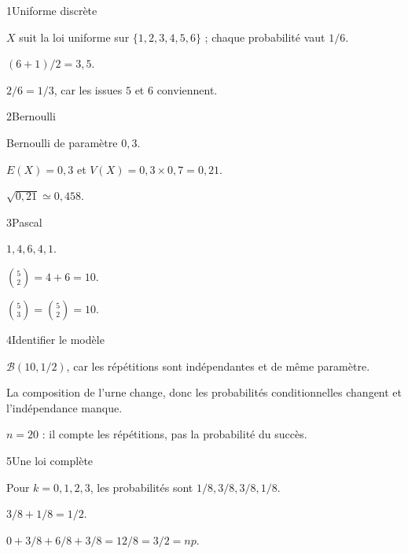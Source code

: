 \begin{corrige}{1}{Uniforme discrète}
\begin{questions}
\item $X$ suit la loi uniforme sur $\{1,2,3,4,5,6\}$ ; chaque probabilité vaut $1/6$.
\item $(6+1)/2=3{,}5$.
\item $2/6=1/3$, car les issues $5$ et $6$ conviennent.
\end{questions}
\end{corrige}
\begin{corrige}{2}{Bernoulli}
\begin{questions}
\item Bernoulli de paramètre $0{,}3$.
\item $E(X)=0{,}3$ et $V(X)=0{,}3\times0{,}7=0{,}21$.
\item $\sqrt{0{,}21}\simeq0{,}458$.
\end{questions}
\end{corrige}
\begin{corrige}{3}{Pascal}
\begin{questions}
\item $1,4,6,4,1$.
\item $\binom52=4+6=10$.
\item $\binom53=\binom52=10$.
\end{questions}
\end{corrige}
\begin{corrige}{4}{Identifier le modèle}
\begin{questions}
\item $\mathcal B(10,1/2)$, car les répétitions sont indépendantes et de même paramètre.
\item La composition de l’urne change, donc les probabilités conditionnelles changent et l’indépendance manque.
\item $n=20$ : il compte les répétitions, pas la probabilité du succès.
\end{questions}
\end{corrige}
\begin{corrige}{5}{Une loi complète}
\begin{questions}
\item Pour $k=0,1,2,3$, les probabilités sont $1/8,3/8,3/8,1/8$.
\item $3/8+1/8=1/2$.
\item $0+3/8+6/8+3/8=12/8=3/2=np$.
\end{questions}
\end{corrige}
